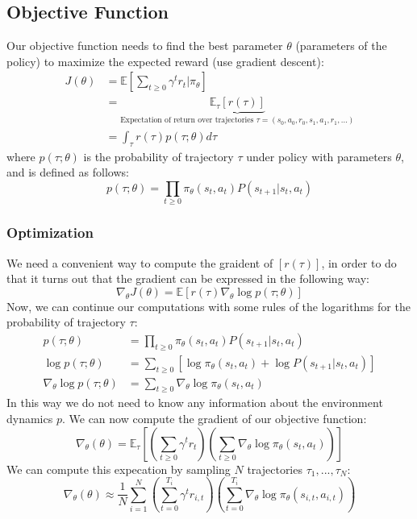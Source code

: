 \subsection{Objective Function}
Our objective function needs to find the best parameter \(\theta\) (parameters of the policy) to maximize the expected reward (use gradient descent):
\begin{align}
    J(\theta) &= \mathbb{E} \left[
        \sum_{t \geq 0} \gamma^t r_t | \pi_\theta
    \right]\\
    &= \underbrace{\mathbb{E}_\tau [r(\tau)]}_{\text{Expectation of return over trajectories } \tau = (s_0, a_0, r_0, s_1, a_1, r_1, ...)}\\
    &= \int_\tau r(\tau) p(\tau; \theta) d\tau
\end{align}
where \(p(\tau; \theta)\) is the probability of trajectory \(\tau\) under policy with parameters \(\theta\), and is defined as follows:
\begin{equation}
    p(\tau; \theta) = \prod_{t \geq 0} \pi_\theta (s_t,a_t) P(s_{t+1} | s_t, a_t)
\end{equation}
\subsubsection{Optimization}
We need a convenient way to compute the graident of \(\mathbb{} [r(\tau)]\), in order to do that it turns out that the gradient can be expressed in the following way:
\begin{equation}
    \nabla_\theta J(\theta) = \mathbb{E} [r(\tau) \nabla_\theta \log p(\tau; \theta)]
\end{equation}
Now, we can continue our computations with some rules of the logarithms for the probability of trajectory \(\tau\):
\begin{align}
    p(\tau; \theta) &= \prod_{t \geq 0} \pi_\theta (s_t, a_t) P(s_{t+1} | s_t, a_t)\\
    \log p(\tau ; \theta) &= \sum_{t \geq 0} [\log \pi_\theta (s_t, a_t) + \log P(s_{t+1} | s_t, a_t)]\\
    \nabla_\theta \log p(\tau; \theta) &= \sum_{t \geq 0} \nabla_\theta \log \pi_\theta (s_t, a_t)
\end{align}
In this way we do not need to know any information about the environment dynamics \(p\). We can now compute the gradient of our objective function:
\begin{equation}
    \nabla_\theta (\theta) = \mathbb{E}_\tau \left[
        \left(
            \sum_{t \geq 0} \gamma^t r_t
        \right) \left(
            \sum_{t \geq 0} \nabla_\theta \log \pi_\theta (s_t, a_t)
        \right)
    \right]
\end{equation}
We can compute this expecation by sampling \(N\) trajectories \(\tau_1, ..., \tau_N\):
\begin{equation}
    \nabla_\theta (\theta) \approx \frac 1 N \sum_{i=1}^N \left(
        \sum_{t = 0}^{T_i} \gamma^t r_{i,t}
    \right) \left(
        \sum_{t = 0}^{T_i} \nabla_\theta \log \pi_\theta (s_{i,t}, a_{i,t})
    \right)
\end{equation}
